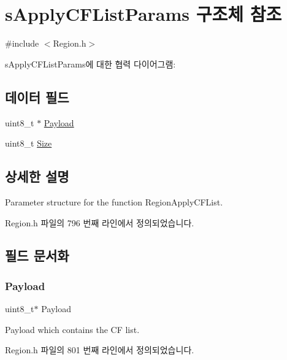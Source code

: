 \hypertarget{structs_apply_c_f_list_params}{}\section{s\+Apply\+C\+F\+List\+Params 구조체 참조}
\label{structs_apply_c_f_list_params}


{\ttfamily \#include $<$Region.\+h$>$}



s\+Apply\+C\+F\+List\+Params에 대한 협력 다이어그램\+:
\subsection*{데이터 필드}
\begin{DoxyCompactItemize}
\item 
uint8\+\_\+t $\ast$ \mbox{\hyperlink{structs_apply_c_f_list_params_a3dfbfe76c8f3bd25765750487b815147}{Payload}}
\item 
uint8\+\_\+t \mbox{\hyperlink{structs_apply_c_f_list_params_ace31de7598e85e87624c4e7d8e5d112c}{Size}}
\end{DoxyCompactItemize}


\subsection{상세한 설명}
Parameter structure for the function Region\+Apply\+C\+F\+List. 

Region.\+h 파일의 796 번째 라인에서 정의되었습니다.



\subsection{필드 문서화}
\mbox{\label{structs_apply_c_f_list_params_a3dfbfe76c8f3bd25765750487b815147}} 
\subsubsection{\texorpdfstring{Payload}{Payload}}
{\footnotesize\ttfamily uint8\+\_\+t$\ast$ Payload}

Payload which contains the CF list. 

Region.\+h 파일의 801 번째 라인에서 정의되었습니다.

